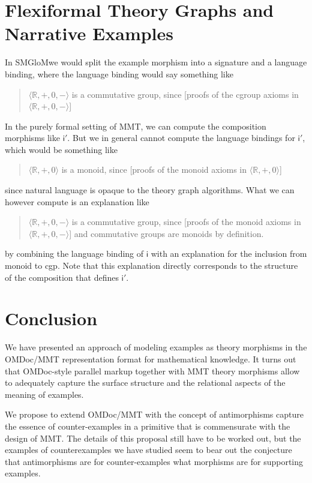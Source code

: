 \documentclass[11pt]{bluenote}
\def\mmt{MMT\xspace}
\def\omdoc{OMDoc\xspace}
\def\smglom{SMGloM}
\def\omdoc{OMDoc\xspace}
\begin{document}
\section{Flexiformal Theory Graphs and Narrative Examples}

In \smglom we would split the example morphism into a signature and a language binding,
where the language binding would say something like 
\begin{quote}
  $\langle\mathbb{R},+,0,-\rangle$ is a commutative group, since [proofs of the cgroup
  axioms in $\langle\mathbb{R},+,0,-\rangle$]
\end{quote}
In the purely formal setting of MMT, we can compute the composition morphisms like
$\mathsf{i}'$. But we in general cannot compute the language bindings for $\mathsf{i}'$,
which would be something like 
\begin{quote}
  $\langle\mathbb{R},+,0\rangle$ is a monoid, since [proofs of the monoid axioms in $\langle\mathbb{R},+,0\rangle$]
\end{quote}
since natural language is opaque to the theory graph algorithms. What we can however
compute is an explanation like 
\begin{quote}
  $\langle\mathbb{R},+,0,-\rangle$ is a commutative group, since [proofs of the monoid
  axioms in $\langle\mathbb{R},+,0,-\rangle$] and commutative groups are monoids by
  definition.
\end{quote}
by combining the language binding of $\mathsf{i}$ with an explanation for the inclusion
from \textsf{monoid} to \textsf{cgp}. Note that this explanation directly corresponds to
the structure of the composition that defines $\mathsf{i}'$.

\section{Conclusion}

We have presented an approach of modeling examples as theory morphisms in the \omdoc/\mmt
representation format for mathematical knowledge.  It turns out that \omdoc-style parallel
markup together with \mmt theory morphisms allow to adequately capture the surface
structure and the relational aspects of the meaning of examples.

We propose to extend \omdoc/\mmt with the concept of antimorphisms capture the essence of
counter-examples in a primitive that is commensurate with the design of \mmt. The details
of this proposal still have to be worked out, but the examples of counterexamples we have
studied seem to bear out the conjecture that antimorphisms are for counter-examples what
morphisms are for supporting examples. 
\end{document}
